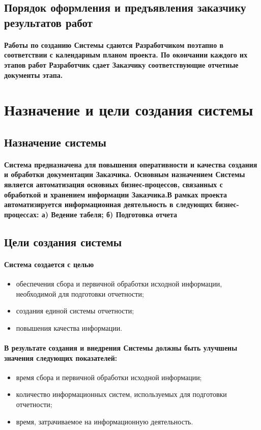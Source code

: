 \documentclass{article}
\begin{document}
    \subsection{Порядок оформления и предъявления заказчику результатов работ}
        \paragraph{Работы по созданию Системы сдаются Разработчиком поэтапно в соответствии с календарным планом проекта. По окончании каждого их этапов работ Разработчик сдает Заказчику соответствующие отчетные документы этапа.}

\section{Назначение и цели создания системы}
    \subsection{Назначение системы}
        \paragraph{Система предназначена для повышения оперативности и качества создания и обработки документации Заказчика. Основным назначением Системы является автоматизация основных бизнес-процессов, связанных с обработкой и хранением информации Заказчика.В рамках проекта автоматизируется информационная деятельность в следующих бизнес-процессах: а) Ведение табеля; б) Подготовка отчета }
    \subsection{Цели создания системы}
        \paragraph{Система создается с целью}
        \begin{itemize}
            \item обеспечения сбора и первичной обработки исходной информации, необходимой для подготовки отчетности;
            \item создания единой системы отчетности;
            \item повышения качества информации.
        \end{itemize}
        
        \paragraph{В результате создания и внедрения Системы должны быть улучшены значения следующих показателей:}
        \begin{itemize}
            \item время сбора и первичной обработки исходной информации;
            \item количество информационных систем, используемых для подготовки отчетности;
            \item время, затрачиваемое на информационную деятельность.
        \end{itemize}
   
\end{document}
